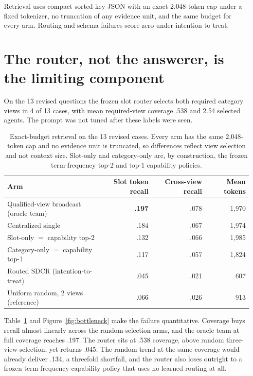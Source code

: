 \documentclass{article}
\begin{document}
Retrieval uses compact sorted-key JSON with an exact 2{,}048-token cap under a fixed tokenizer, no truncation of any evidence unit, and the same budget for every arm. Routing and schema failures score zero under intention-to-treat.

\section{The router, not the answerer, is the limiting component}
On the 13 revised questions the frozen slot router selects both required category views in 4 of 13 cases, with mean required-view coverage .538 and 2.54 selected agents. The prompt was not tuned after these labels were seen.

\begin{table}[t]
\centering
\caption{Exact-budget retrieval on the 13 revised cases. Every arm has the same 2,048-token cap and no evidence unit is truncated, so differences reflect view selection and not context size. Slot-only and category-only are, by construction, the frozen term-frequency top-2 and top-1 capability policies.}
\label{tab:retrieval}
\small
\begin{tabular}{lrrr}
\toprule
Arm & Slot token recall & Cross-view recall & Mean tokens\\
\midrule
Qualified-view broadcast (oracle team) & \textbf{.197} & .078 & 1{,}970\\
Centralized single & .184 & .067 & 1{,}974\\
Slot-only $=$ capability top-2 & .132 & .066 & 1{,}985\\
Category-only $=$ capability top-1 & .117 & .057 & 1{,}824\\
Routed SDCR (intention-to-treat) & .045 & .021 & 607\\
\midrule
Uniform random, 2 views (reference) & .066 & .026 & 913\\
\bottomrule
\end{tabular}
\end{table}

Table~\ref{tab:retrieval} and Figure~\ref{fig:bottleneck} make the failure quantitative. Coverage buys recall almost linearly across the random-selection arms, and the oracle team at full coverage reaches .197. The router sits at .538 coverage, above random three-view selection, yet returns .045. The random trend at the same coverage would already deliver .134, a threefold shortfall, and the router also loses outright to a frozen term-frequency capability policy that uses no learned routing at all.
\end{document}
